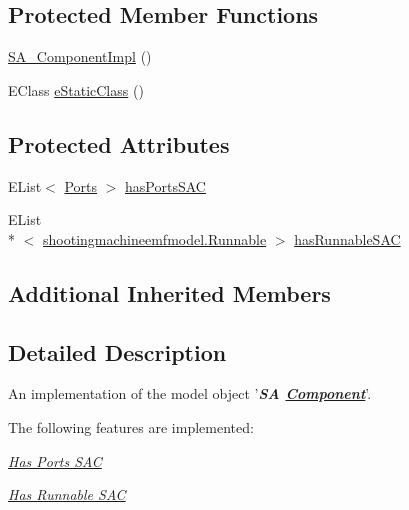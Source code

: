 \subsection*{Protected Member Functions}
\begin{DoxyCompactItemize}
\item 
\hyperlink{classshootingmachineemfmodel_1_1impl_1_1_s_a___component_impl_a51550527fcfd4532f706d85f00d876a1}{S\-A\-\_\-\-Component\-Impl} ()
\item 
E\-Class \hyperlink{classshootingmachineemfmodel_1_1impl_1_1_s_a___component_impl_ae4030fdfb45f0e29fca784018f62da21}{e\-Static\-Class} ()
\end{DoxyCompactItemize}
\subsection*{Protected Attributes}
\begin{DoxyCompactItemize}
\item 
E\-List$<$ \hyperlink{interfaceshootingmachineemfmodel_1_1_ports}{Ports} $>$ \hyperlink{classshootingmachineemfmodel_1_1impl_1_1_s_a___component_impl_a359f485fb955ec6fe15f6ac9986ba568}{has\-Ports\-S\-A\-C}
\item 
E\-List\\*
$<$ \hyperlink{interfaceshootingmachineemfmodel_1_1_runnable}{shootingmachineemfmodel.\-Runnable} $>$ \hyperlink{classshootingmachineemfmodel_1_1impl_1_1_s_a___component_impl_a22a494ca31428e1931f826c0cb14ecb9}{has\-Runnable\-S\-A\-C}
\end{DoxyCompactItemize}
\subsection*{Additional Inherited Members}


\subsection{Detailed Description}
An implementation of the model object '{\itshape {\bfseries S\-A \hyperlink{interfaceshootingmachineemfmodel_1_1_component}{Component}}}'.

The following features are implemented\-: 
\begin{DoxyItemize}
\item \hyperlink{classshootingmachineemfmodel_1_1impl_1_1_s_a___component_impl_a33cf8cec28514b7843445dc395c5b072}{{\itshape Has Ports S\-A\-C}} 
\item \hyperlink{classshootingmachineemfmodel_1_1impl_1_1_s_a___component_impl_a4e201e8a6ffc5a7434539c6b2d36e1e4}{{\itshape Has Runnable S\-A\-C}} 
\end{DoxyItemize}

